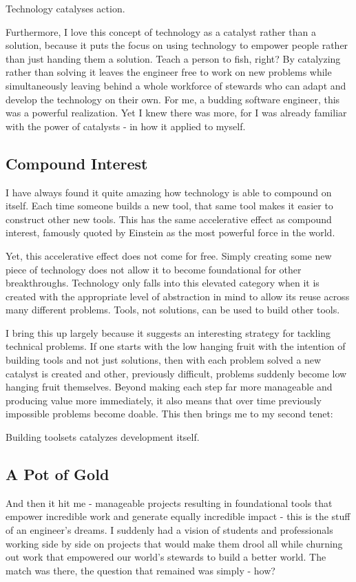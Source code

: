 \documentclass[10pt,a5paper]{book}
\begin{document}
Technology catalyses action. 
 
Furthermore, I love this concept of technology as a catalyst rather than a solution, because it puts the focus on using technology to empower people rather than just handing them a solution. Teach a person to fish, right? By catalyzing rather than solving it leaves the engineer free to work on new problems while simultaneously leaving behind a whole workforce of stewards who can adapt and develop the technology on their own. For me, a budding software engineer, this was a powerful realization. Yet I knew there was more, for I was already familiar with the power of catalysts - in how it applied to myself. 

\subsection{Compound Interest}
I have always found it quite amazing how technology is able to compound on itself. Each time someone builds a new tool, that same tool makes it easier to construct other new tools. This has the same accelerative effect as compound interest, famously quoted by Einstein as the most powerful force in the world. 

Yet, this accelerative effect does not come for free. Simply creating some new piece of technology does not allow it to become foundational for other breakthroughs. Technology only falls into this elevated category when it is created with the appropriate level of abstraction in mind to allow its reuse across many different problems. Tools, not solutions, can be used to build other tools. 

I bring this up largely because it suggests an interesting strategy for tackling technical problems. If one starts with the low hanging fruit with the intention of building tools and not just solutions, then with each problem solved a new catalyst is created and other, previously difficult, problems suddenly become low hanging fruit themselves. Beyond making each step far more manageable and producing value more immediately, it also means that over time previously impossible problems become doable. This then brings me to my second tenet:

Building toolsets catalyzes development itself.

\subsection{A Pot of Gold}
And then it hit me - manageable projects resulting in foundational tools that empower incredible work and generate equally incredible impact - this is the stuff of an engineer's dreams. I suddenly had a vision of students and professionals working side by side on projects that would make them drool all while churning out work that empowered our world's stewards to build a better world. The match was there, the question that remained was simply - how? 
\end{document}
